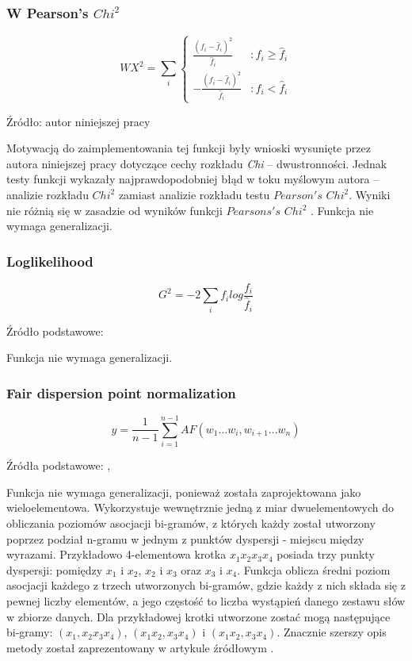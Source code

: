 \subsubsection{W Pearson's \(Chi^{2}\)}
$$ WX^2 = \sum_{i} \left\{\begin{array}{lr} 
	\frac{(f_{i} - \hat{f}_{i})^2}{\hat{f}_{i}} & : f_{i} \ge \hat{f}_{i} \\ 
	-\frac{(f_{i} - \hat{f}_{i})^2}{\hat{f}_{i}} & : f_{i} < \hat{f}_{i}
\end{array}\right. $$

Źródło: autor niniejszej pracy
\par
Motywacją do zaimplementowania tej funkcji były wnioski wysunięte przez autora niniejszej pracy dotyczące cechy rozkładu \emph{Chi} -- dwustronności.
Jednak testy funkcji wykazały najprawdopodobniej błąd w toku myślowym autora -- analizie rozkładu $ Chi^{2} $ zamiast analizie rozkładu testu $ Pearson's $ $ Chi^{2} $.
Wyniki nie różnią się w zasadzie od wyników funkcji $ Pearsons's $ $ Chi^{2} $ .
Funkcja nie wymaga generalizacji.

\subsubsection{Loglikelihood}
$$ G^{2} = -2\sum_{i}f_{i}log\frac{f_{i}}{\hat{f}_{i}} $$

Źródło podstawowe: \cite[str. 18]{pecina_measures} 
\par
Funkcja nie wymaga generalizacji.
	
\subsubsection{Fair dispersion point normalization}
$$ y = \frac{1}{n-1} \sum^{n-1}_{i=1}AF(w_{1} ... w_{i}, w_{i+1} ... w_{n}) $$

Źródła podstawowe: \cite{fdpn}, \cite[str. 5]{generalization_patterns}
\par 
Funkcja nie wymaga generalizacji, ponieważ została zaprojektowana jako wieloelementowa.
Wykorzystuje wewnętrznie jedną z miar dwuelementowych do obliczania poziomów asocjacji bi-gramów, z których każdy został utworzony poprzez podział n-gramu w jednym z punktów dyspersji - miejscu między wyrazami.
Przykładowo 4-elementowa krotka $ x_{1}x_{2}x_{3}x_{4} $ posiada trzy punkty dyspersji: pomiędzy $ x_{1} $ i $ x_{2} $, $ x_{2} $ i $ x_{3} $ oraz $ x_{3} $ i $ x_{4} $.
Funkcja oblicza średni poziom asocjacji każdego z trzech utworzonych bi-gramów, gdzie każdy z nich składa się z pewnej liczby elementów, a jego częstość to liczba wystąpień danego zestawu słów w zbiorze danych.
Dla przykładowej krotki utworzone zostać mogą następujące bi-gramy: $ (x_{1}, x_{2}x_{3}x_{4}) $, $ (x_{1}x_{2}, x_{3}x_{4}) $ i $ (x_{1}x_{2}, x_{3}x_{4}) $.
Znacznie szerszy opis metody został zaprezentowany w artykule źródłowym \cite{fdpn}.

